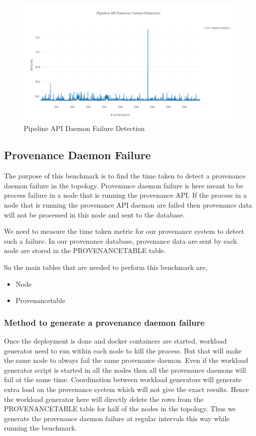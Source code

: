 \begin{figure}[H]
	\center
	\includegraphics[width=1\textwidth]{figures/benchmark_pipeline.png}
	\caption{Pipeline API Daemon Failure Detection}
	\label{fig:benchmark_pipeline}
\end{figure}

\subsection{Provenance Daemon Failure}

The purpose of this benchmark is to find the time taken to detect a provenance daemon failure in the topology. Provenance daemon failure is here meant to be process failure in a node that is running the provenance API. If the process in a node that is running the provenance API daemon are failed then provenance data will not be processed in this node and sent to the database.

We need to measure the time taken metric for our provenance system to detect such a failure. In our provenance database, provenance data are sent by each node are stored in the PROVENANCETABLE table.

So the main tables that are needed to perform this benchmark are,
    \begin{itemize}
        \item Node
        \item Provenancetable
    \end{itemize}

\subsubsection{Method to generate a provenance daemon failure}

Once the deployment is done and docker containers are started, workload generator need to run within each node to kill the process. But that will make the same node to always fail the same provenance daemon. Even if the workload generator script is started in all the nodes then all the provenance daemons will fail at the same time. Coordination between workload generators will generate extra load on the provenance system which will not give the exact results. Hence the workload generator here will directly delete the rows from the PROVENANCETABLE table for half of the nodes in the topology. Thus we generate the provenance daemon failure at regular intervals this way while running the benchmark.

